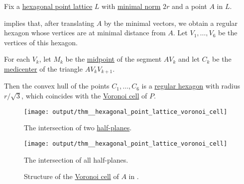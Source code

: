 \begin{proposition}\label{thm:hexagonal_point_lattice_voronoi_cell}
  Fix a \hyperref[def:hexagonal_point_lattice]{hexagonal point lattice} \( L \) with \hyperref[def:minimal_lattice_vector]{minimal norm} \( 2r \) and a point \( A \) in \( L \).

   implies that, after translating \( A \) by the minimal vectors, we obtain a regular hexagon whose vertices are at minimal distance from \( A \). Let \( V_1, \ldots, V_6 \) be the vertices of this hexagon.

  For each \( V_k \), let \( M_k \) be the \hyperref[thm:segment_midpoint]{midpoint} of the segment \( AV_k \) and let \( C_k \) be the \hyperref[thm:medicenter]{medicenter} of the triangle \( A V_k V_{k+1} \).

  Then the convex hull of the points \( C_1, \ldots, C_6 \) is a \hyperref[def:regular_polygon]{regular hexagon} with radius \( r / {\sqrt 3} \), which coincides with the \hyperref[def:voronoi_cell]{Voronoi cell} of \( P \).

  \begin{figure}[!ht]
    \begin{subcaptionblock}[t]{0.45\linewidth}
      \centering
      \texttt{[image: output/thm\_\_hexagonal\_point\_lattice\_voronoi\_cell]}
      \caption{The intersection of two \hyperref[def:half_space]{half-planes}.}\label{fig:thm:hexagonal_point_lattice_voronoi_cell/construction}
    \end{subcaptionblock}
    \hfill
    \begin{subcaptionblock}[t]{0.45\linewidth}
      \centering
      \texttt{[image: output/thm\_\_hexagonal\_point\_lattice\_voronoi\_cell]}
      \caption{The intersection of all half-planes.}\label{fig:thm:hexagonal_point_lattice_voronoi_cell/result}
    \end{subcaptionblock}
    \caption{Structure of the \hyperref[def:voronoi_cell]{Voronoi cell} of \( A \) in .}\label{fig:thm:hexagonal_point_lattice_voronoi_cell}
  \end{figure}
\end{proposition}
